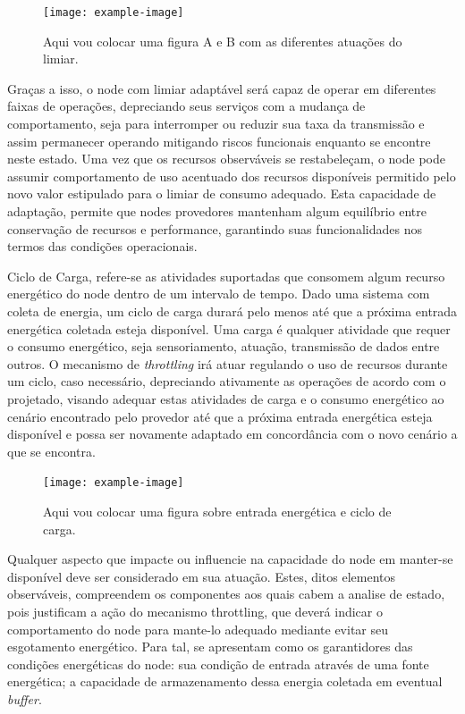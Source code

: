 \begin{itemize}
    \begin{figure}[h]
    	\centering
    	\texttt{[image: example-image]} 
    	\caption{Aqui vou colocar uma figura A e B com as diferentes atuações do limiar.}
    \end{figure}
    
    Graças a isso, o node com limiar adaptável será capaz de operar em diferentes faixas de operações, depreciando seus serviços com a mudança de comportamento, seja para interromper ou reduzir sua taxa da transmissão e assim permanecer operando mitigando riscos funcionais enquanto se encontre neste estado. Uma vez que os recursos observáveis se restabeleçam, o node pode assumir comportamento de uso acentuado dos recursos disponíveis permitido pelo novo valor estipulado para o limiar de consumo adequado. Esta capacidade de adaptação, permite que nodes provedores mantenham algum equilíbrio entre conservação de recursos e performance, garantindo suas funcionalidades nos termos das condições operacionais.
    
      
 
    
\end{itemize}


Ciclo de Carga, refere-se as atividades suportadas que consomem algum recurso energético do node dentro de um intervalo de tempo. Dado uma sistema com coleta de energia, um ciclo de carga durará pelo menos até que a próxima entrada energética coletada esteja disponível.  Uma carga é qualquer atividade que requer o consumo energético, seja sensoriamento, atuação, transmissão de dados entre outros. O mecanismo de \textit{throttling} irá atuar regulando o uso de recursos durante um ciclo, caso necessário, depreciando ativamente as operações de acordo com o projetado, visando adequar estas atividades de carga e o consumo energético ao cenário encontrado pelo provedor até que a próxima entrada energética esteja disponível e possa ser novamente adaptado em concordância com o novo cenário a que se encontra.

   \begin{figure}[h]
	\centering
	\noindent\texttt{[image: example-image]} 
	\caption{Aqui vou colocar uma figura sobre entrada energética e ciclo de carga.}
\end{figure}

Qualquer aspecto que impacte ou influencie na capacidade do node em manter-se disponível deve ser considerado em sua atuação. Estes, ditos elementos observáveis, compreendem os componentes aos quais cabem a analise de estado, pois justificam a ação do mecanismo throttling, que deverá indicar o comportamento do node para mante-lo adequado mediante evitar seu esgotamento energético. Para tal, se apresentam como os garantidores das condições energéticas do node: sua condição de entrada através de uma fonte energética; a capacidade de armazenamento dessa energia coletada em eventual \textit{buffer}. 

